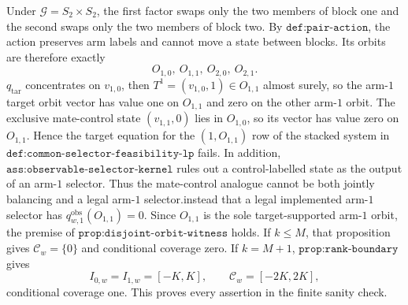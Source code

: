 Under \(\mathcal G=S_2\times S_2\), the first factor swaps only the two members of block one and the second swaps only the two members of block two. By \(\texttt{def:pair-action}\), the action preserves arm labels and cannot move a state between blocks. Its orbits are therefore exactly\n\[O_{1,0},\ O_{1,1},\ O_{2,0},\ O_{2,1}.\]\nIf \(q_{\mathrm{tar}}\) concentrates on \(v_{1,0}\), then \(T^1=(v_{1,0},1)\in O_{1,1}\) almost surely, so the arm-\(1\) target orbit vector has value one on \(O_{1,1}\) and zero on the other arm-\(1\) orbit. The exclusive mate-control state \((v_{1,1},0)\) lies in \(O_{1,0}\), so its vector has value zero on \(O_{1,1}\). Hence the target equation for the \((1,O_{1,1})\) row of the stacked system in \(\texttt{def:common-selector-feasibility-lp}\) fails. In addition, \(\texttt{ass:observable-selector-kernel}\) rules out a control-labelled state as the output of an arm-\(1\) selector. Thus the mate-control analogue cannot be both jointly balancing and a legal arm-\(1\) selector.\n\nSuppose instead that a legal implemented arm-\(1\) selector has \(q^{\mathrm{obs}}_{w,1}(O_{1,1})=0\). Since \(O_{1,1}\) is the sole target-supported arm-\(1\) orbit, the premise of \(\texttt{prop:disjoint-orbit-witness}\) holds. If \(k\le M\), that proposition gives \(\mathcal C_w=\{0\}\) and conditional coverage zero. If \(k=M+1\), \(\texttt{prop:rank-boundary}\) gives\n\[I_{0,w}=I_{1,w}=[-K,K],\qquad \mathcal C_w=[-2K,2K],\]\nand conditional coverage one. This proves every assertion in the finite sanity check.
